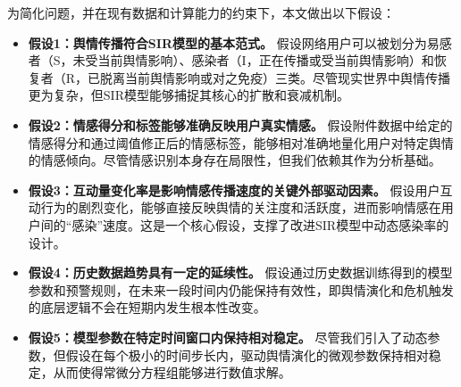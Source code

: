 \documentclass[withoutpreface,bwprint]{cumcmthesis}
\begin{document}
为简化问题，并在现有数据和计算能力的约束下，本文做出以下假设：

\begin{itemize}[itemindent=2em]
\item \textbf{假设1：舆情传播符合SIR模型的基本范式。} 假设网络用户可以被划分为易感者（S，未受当前舆情影响）、感染者（I，正在传播或受当前舆情影响）和恢复者（R，已脱离当前舆情影响或对之免疫）三类。尽管现实世界中舆情传播更为复杂，但SIR模型能够捕捉其核心的扩散和衰减机制。
\item \textbf{假设2：情感得分和标签能够准确反映用户真实情感。} 假设附件数据中给定的情感得分和通过阈值修正后的情感标签，能够相对准确地量化用户对特定舆情的情感倾向。尽管情感识别本身存在局限性，但我们依赖其作为分析基础。
\item \textbf{假设3：互动量变化率是影响情感传播速度的关键外部驱动因素。} 假设用户互动行为的剧烈变化，能够直接反映舆情的关注度和活跃度，进而影响情感在用户间的“感染”速度。这是一个核心假设，支撑了改进SIR模型中动态感染率的设计。
\item \textbf{假设4：历史数据趋势具有一定的延续性。} 假设通过历史数据训练得到的模型参数和预警规则，在未来一段时间内仍能保持有效性，即舆情演化和危机触发的底层逻辑不会在短期内发生根本性改变。
\item \textbf{假设5：模型参数在特定时间窗口内保持相对稳定。} 尽管我们引入了动态参数，但假设在每个极小的时间步长内，驱动舆情演化的微观参数保持相对稳定，从而使得常微分方程组能够进行数值求解。
\end{itemize}


\end{document}
